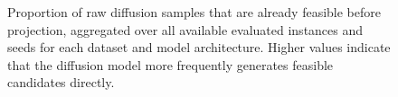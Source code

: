 \begin{figure}[t]
\begin{tikzpicture}
\end{tikzpicture}
\caption{Proportion of raw diffusion samples that are already feasible before projection, aggregated over all available evaluated instances and seeds for each dataset and model architecture. Higher values indicate that the diffusion model more frequently generates feasible candidates directly.}
\label{fig:diffusion_feasible_sample_rate}
\end{figure}